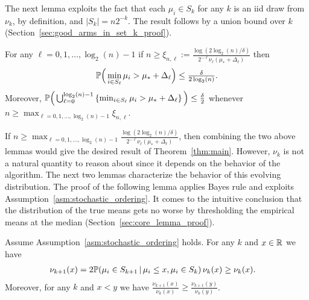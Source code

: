 The next lemma exploits the fact that each $\mu_i \in S_k$ for any $k$ is an iid draw from $\nu_k$, by definition, and $|S_k| = n 2^{-k}$.
The result follows by a union bound over $k$ (Section~\ref{sec:good_arms_in_set_k_proof}).
\begin{lemma}\label{lem:good_arms_in_set_k}
For any $\ell=0,1,\dots,\log_2(n)-1$ if  $n \geq \xi_{n,\ell} := \frac{\log(2 \log_2(n)/\delta)}{2^{-\ell} \nu_\ell(\mu_* + \Delta_\ell)}$ then 
\begin{align*}
\P\Big(\min_{i \in S_\ell} \mu_i > \mu_* + \Delta_\ell \Big) \leq \tfrac{\delta}{2 \log_2(n)}.
\end{align*}
Moreover, $\P\Big( \bigcup_{\ell=0}^{\log_2(n)-1} \left\{ \min_{i \in S_\ell} \mu_i > \mu_* + \Delta_\ell \right\} \Big)\leq \frac{\delta}{2}$
whenever $n \geq \max_{\ell=0,1,\dots,\log_2(n)-1} \xi_{n,\ell}$.
\end{lemma}


If $n \geq  \max_{\ell=0,1,\dots,\log_2(n)-1} \frac{\log(2 \log_2(n)/\delta)}{2^{-\ell} \nu_\ell(\mu_* + \Delta_\ell)}$, then combining the two above lemmas would give the desired result of Theorem~\ref{thm:main}.
However, $\nu_k$ is not a natural quantity to reason about since it depends on the behavior of the algorithm.
The next two lemmas characterize the behavior of this evolving distribution.
The proof of the following lemma applies Bayes rule and exploits Assumption~\ref{asm:stochastic_ordering}. 
It comes to the intuitive conclusion that the distribution of the true means gets no worse by thresholding the empirical means at the median (Section~\ref{sec:core_lemma_proof}).
\begin{lemma}\label{lem:core_lemma}
Assume Assumption~\ref{asm:stochastic_ordering} holds.
For any $k$ and $x\in \R$ we have
\begin{align*}
\nu_{k+1}(x) &= 2 \P( \mu_i \in S_{k+1} \, | \, \mu_i \leq x, \mu_i \in S_{k} ) \, \nu_k(x)
\geq \nu_k(x).
\end{align*}
Moreover, for any $k$ and $x < y$ we have $\frac{\nu_{k+1}(x)}{\nu_k(x)} \geq \frac{\nu_{k+1}(y)}{\nu_k(y)}$.
\end{lemma} 

